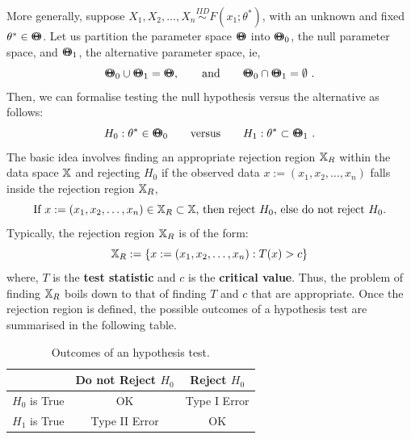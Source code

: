 More generally, suppose $X_1,X_2,\ldots,X_n \overset{IID}{\sim} F(x_1;\theta^*)$, with an unknown and fixed $\theta^* \in {\Theta}\mspace{-11 mu}{\Theta}$.  Let us partition the parameter space ${\Theta}\mspace{-11 mu}{\Theta}$ into ${\Theta}\mspace{-11 mu}{\Theta}_0$, the null parameter space, and ${\Theta}\mspace{-11 mu}{\Theta}_1$, the alternative parameter space, ie,
$$\BB{\Theta}_0 \cup \BB{\Theta}_1 = \BB{\Theta}, \qquad \text{and} \qquad \BB{\Theta}_0 \cap \BB{\Theta}_1 = \emptyset \ .$$
Then, we can formalise testing the null hypothesis versus the alternative as follows:
\[
H_0 : \theta^* \in {\Theta}\mspace{-11 mu}{\Theta}_0 \qquad \text{versus} \qquad H_1 :  \theta^* \subset {\Theta}\mspace{-11 mu}{\Theta}_1 \ .
\]
The basic idea involves finding an appropriate rejection region $\mathbb{X}_R$ within the data space $\mathbb{X}$ and rejecting $H_0$ if the observed data $x:=(x_1,x_2,\ldots,x_n)$ falls inside the rejection region $\mathbb{X}_R$,
\[
\text{If $x:=(x_1,x_2,\ldots,x_n) \in \mathbb{X}_R \subset \mathbb{X}$, then reject $H_0$, else do not reject $H_0$.} 
\]
Typically, the rejection region $\mathbb{X}_R$ is of the form:
\[
\mathbb{X}_R := \{ x:=(x_1,x_2,\ldots,x_n)  : T(x) > c \}
\]
where, $T$ is the {\bf test statistic} and $c$ is the {\bf critical value}.  Thus, the problem of finding $\mathbb{X}_R$ boils down to that of finding $T$ and $c$ that are appropriate.  Once the rejection region is defined, the possible outcomes of a hypothesis test are summarised in the following table.
\begin{table}[htbp]
\begin{center}
\caption{Outcomes of an hypothesis test.}
\begin{tabular}{c|c|c}\hline
& Do not Reject $H_0$ & Reject $H_0$ \\ \hline
$H_0$ is True & OK & Type I Error \\ \hline
$H_1$ is True & Type II Error & OK \\ \hline
\end{tabular}
\end{center}
\end{table}

